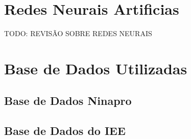 \section{Redes Neurais Artificias}

	TODO: REVISÃO SOBRE REDES NEURAIS

\section{Base de Dados Utilizadas}
\subsection{Base de Dados Ninapro}
\subsection{Base de Dados do IEE}
